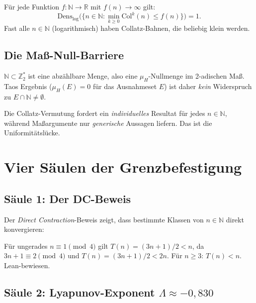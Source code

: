 \documentclass[12pt,a4paper]{article}
\newcommand{\N}{\mathbb{N}}
\newcommand{\R}{\mathbb{R}}
\newcommand{\Ztwo}{\mathbb{Z}_2}
\newcommand{\col}{\mathrm{Col}}
\begin{document}
\begin{tcolorbox}[ergebnis, title={Taos Hauptergebnis (Forum Math.\ Pi, 2022)}]
Für jede Funktion $f: \N \to \R$ mit $f(n) \to \infty$ gilt:
\[
  \mathrm{Dens}_{\log}\bigl(\{n \in \N : \min_{k\geq 0}\col^k(n)
  \leq f(n)\}\bigr) = 1.
\]
Fast alle $n \in \N$ (logarithmisch) haben Collatz-Bahnen, die
beliebig klein werden.
\end{tcolorbox}

\subsection{Die Maß-Null-Barriere}

\begin{tcolorbox}[lücke, title={Das fundamentale Hindernis}]
$\N \subset \Ztwo^*$ ist eine abzählbare Menge, also eine $\mu_H$-Nullmenge
im 2-adischen Maß. Taos Ergebnis ($\mu_H(E) = 0$ für das Ausnahmeset $E$)
ist daher \emph{kein} Widerspruch zu $E \cap \N \neq \emptyset$.

\medskip
Die Collatz-Vermutung fordert ein \emph{individuelles} Resultat für jedes
$n \in \N$, während Maß\-argu\-mente nur \emph{generische} Aussagen liefern.
Das ist die Uniformitätslücke.
\end{tcolorbox}

\section{Vier Säulen der Grenzbefestigung}
\label{sec:saeulen}

\subsection{Säule 1: Der DC-Beweis}

Der \emph{Direct Contraction}-Beweis zeigt, dass bestimmte Klassen
von $n \in \N$ direkt konvergieren:

\begin{tcolorbox}[ergebnis]
Für ungerades $n \equiv 1 \pmod{4}$ gilt $T(n) = (3n+1)/2 < n$, da
$3n+1 \equiv 2 \pmod{4}$ und $T(n) = (3n+1)/2 < 2n$. Für $n \geq 3$:
$T(n) < n$. Lean-bewiesen.
\end{tcolorbox}

\subsection{Säule 2: Lyapunov-Exponent $\Lambda \approx -0{,}830$}
\end{document}
